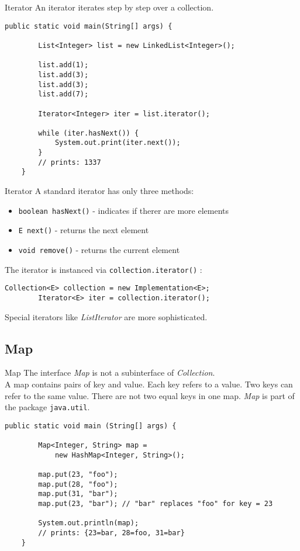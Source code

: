 \begin{frame}[fragile]{Iterator}
    An iterator iterates step by step over a collection.
    \begin{lstlisting}[basicstyle=\ttfamily\scriptsize]
    public static void main(String[] args) {
    
        List<Integer> list = new LinkedList<Integer>();
        
        list.add(1);
        list.add(3);
        list.add(3);
        list.add(7);
        
        Iterator<Integer> iter = list.iterator();
        
        while (iter.hasNext()) {
            System.out.print(iter.next());
        }
        // prints: 1337
    }
    \end{lstlisting}
\end{frame}

\begin{frame}[fragile]{Iterator}
    A standard iterator has only three methods:
    \begin{itemize}
    \item \texttt{boolean hasNext()} - indicates if therer are more elements
    \item \texttt{E next()} - returns the next element
    \item \texttt{void remove()} - returns the current element
    \end{itemize}
    \vspace{1em}
    The iterator is instanced via \texttt{collection.iterator()} :
    \begin{lstlisting}[basicstyle=\ttfamily\scriptsize]
        Collection<E> collection = new Implementation<E>;
        Iterator<E> iter = collection.iterator();
    \end{lstlisting}
    Special iterators like \emph{ListIterator} are more sophisticated.
\end{frame}

\subsection{Map}
\begin{frame}[fragile]{Map}
    The interface \emph{Map} is not a subinterface of \emph{Collection}.\\
    A map contains pairs of key and value. Each key refers to a value. 
    Two keys can refer to the same value. There are not two equal keys in one map.
    \emph{Map} is part of the package \texttt{java.util}.
    \vfill
    \begin{lstlisting}[basicstyle=\ttfamily\scriptsize]
    public static void main (String[] args) {
    
        Map<Integer, String> map = 
            new HashMap<Integer, String>();
        
        map.put(23, "foo");
        map.put(28, "foo");
        map.put(31, "bar");
        map.put(23, "bar"); // "bar" replaces "foo" for key = 23
        
        System.out.println(map);
        // prints: {23=bar, 28=foo, 31=bar}
    }
    \end{lstlisting}
\end{frame}

